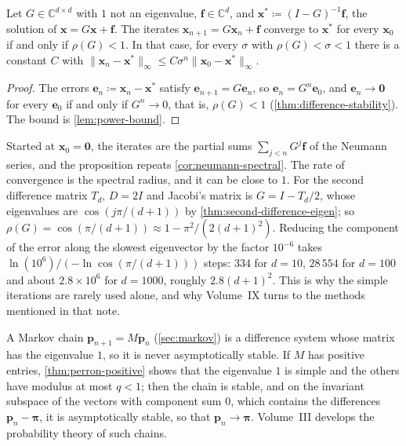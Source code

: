 \begin{proposition}
\label{prop:stationary-iteration}
Let $G\in\mathbb C^{d\times d}$ with $1$ not an eigenvalue, $\mathbf f\in\mathbb C^d$, and $\mathbf x^*\coloneqq(I-G)^{-1}\mathbf f$, the solution of $\mathbf x=G\mathbf x+\mathbf f$. The iterates $\mathbf x_{n+1}=G\mathbf x_n+\mathbf f$ converge to $\mathbf x^*$ for every $\mathbf x_0$ if and only if $\rho(G)<1$. In that case, for every $\sigma$ with $\rho(G)<\sigma<1$ there is a constant $C$ with $\|\mathbf x_n-\mathbf x^*\|_\infty\le C\sigma^n\|\mathbf x_0-\mathbf x^*\|_\infty$.
\end{proposition}

\begin{proof}
The errors $\mathbf e_n\coloneqq\mathbf x_n-\mathbf x^*$ satisfy $\mathbf e_{n+1}=G\mathbf e_n$, so $\mathbf e_n=G^n\mathbf e_0$, and $\mathbf e_n\to\mathbf 0$ for every $\mathbf e_0$ if and only if $G^n\to0$, that is, $\rho(G)<1$ (\cref{thm:difference-stability}). The bound is \cref{lem:power-bound}.
\end{proof}

Started at $\mathbf x_0=\mathbf 0$, the iterates are the partial sums $\sum_{j<n}G^j\mathbf f$ of the Neumann series, and the proposition repeats \cref{cor:neumann-spectral}. The rate of convergence is the spectral radius, and it can be close to $1$. For the second difference matrix $T_d$, $D=2I$ and Jacobi's matrix is $G=I-T_d/2$, whose eigenvalues are $\cos(j\pi/(d+1))$ by \cref{thm:second-difference-eigen}; so $\rho(G)=\cos(\pi/(d+1))\approx1-\pi^2/(2(d+1)^2)$. Reducing the component of the error along the slowest eigenvector by the factor $10^{-6}$ takes $\ln(10^6)/(-\ln\cos(\pi/(d+1)))$ steps: $334$ for $d=10$, $28\,554$ for $d=100$ and about $2.8\times10^6$ for $d=1000$, roughly $2.8(d+1)^2$. This is why the simple iterations are rarely used alone, and why Volume~IX turns to the methods mentioned in that note.

A Markov chain $\mathbf p_{n+1}=M\mathbf p_n$ (\cref{sec:markov}) is a difference system whose matrix has the eigenvalue $1$, so it is never asymptotically stable. If $M$ has positive entries, \cref{thm:perron-positive} shows that the eigenvalue $1$ is simple and the others have modulus at most $q<1$; then the chain is stable, and on the invariant subspace of the vectors with component sum $0$, which contains the differences $\mathbf p_n-\boldsymbol\pi$, it is asymptotically stable, so that $\mathbf p_n\to\boldsymbol\pi$. Volume~III develops the probability theory of such chains.

